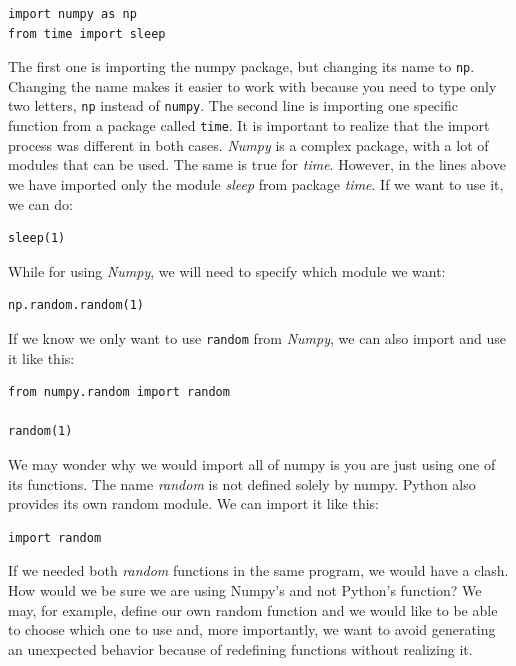\begin{verbatim}
import numpy as np
from time import sleep
\end{verbatim}

The first one is importing the numpy package, but changing its name to \texttt{np}. Changing the name makes it easier to work with because you need to type only two letters, \texttt{np} instead of \texttt{numpy}. The second line is importing one specific function from a package called \texttt{time}. It is important to realize that the import process was different in both cases. \emph{Numpy} is a complex package, with a lot of modules that can be used. The same is true for \emph{time}. However, in the lines above we have imported only the module \emph{sleep} from package \emph{time}. If we want to use it, we can do:

\begin{verbatim}
sleep(1)
\end{verbatim}

While for using \emph{Numpy}, we will need to specify which module we want:

\begin{verbatim}
np.random.random(1)
\end{verbatim}

If we know we only want to use \texttt{random} from \emph{Numpy}, we can also import and use it like this:

\begin{verbatim}
from numpy.random import random

random(1)
\end{verbatim}

We may wonder why we would import all of numpy is you are just using one of its functions. The name \emph{random} is not defined solely by numpy. Python also provides its own random module. We can import it like this:

\begin{verbatim}
import random
\end{verbatim}

If we needed both \emph{random} functions in the same program, we would have a clash. How would we be sure we are using Numpy's and not Python's function? We may, for example, define our own random function and we would like to be able to choose which one to use and, more importantly, we want to avoid generating an unexpected behavior because of redefining functions without realizing it. 

